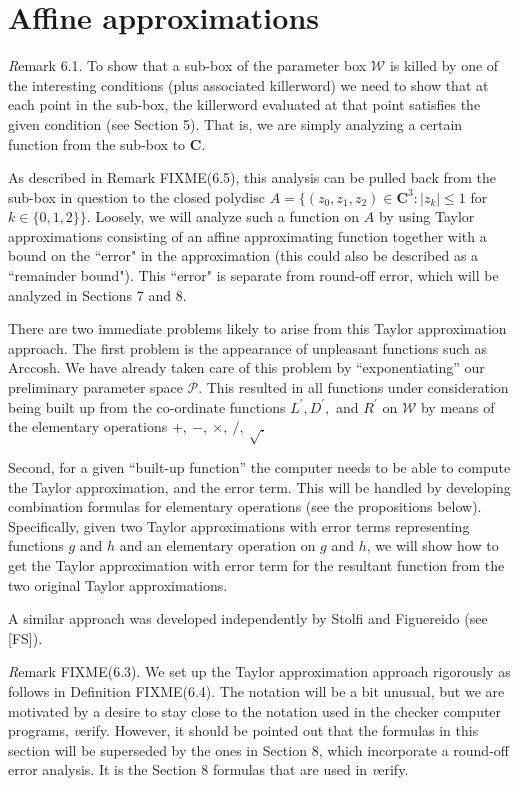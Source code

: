 \section{Affine approximations}

 
{\textit Remark} 6.1.
To show that a sub-box of the parameter box ${\mathcal W}$ is killed by one of the interesting conditions (plus associated killerword) we need to show that at each point in the sub-box, the killerword evaluated at that point satisfies the given condition (see
Section 5).  That is, we are simply analyzing a certain function from the sub-box to ${\mathbf C}$.  

As described in Remark FIXME(6.5), this analysis can be pulled back from the sub-box in question to the closed polydisc 
$A = \{(z_0,z_1,z_2) \in {\mathbf C}^3 : |z_k| \le 1$  for $k \in \{0,1,2\}\}.$  
Loosely,  we will analyze such a function on $A$ by using  Taylor approximations consisting of an affine approximating
function together with a bound on the ``error" in the approximation (this could also be described as a ``remainder bound").  This ``error" 
is separate from round-off error,  which will be analyzed in Sections 7 and 8.  

There are two immediate problems likely to arise from this Taylor approximation approach.
The first problem is the appearance of unpleasant functions such as 
Arccosh.  We have already taken care of this problem by ``exponentiating'' our preliminary parameter space ${\mathcal P}$.  This resulted in all functions under consideration being built up from the co-ordinate functions $ L^{\prime}, D^{\prime},$ and $ R^{\prime}$ on ${\mathcal W}$ by means of the elementary operations $+,\ -,\ \times,\ /,\ \sqrt.$ 

Second,  for a given ``built-up function'' the computer needs to be able to compute the Taylor approximation, and the error term.  This will be handled 
by developing combination formulas for elementary operations (see the propositions below).  Specifically, given two Taylor
approximations with error terms representing functions $g$ and $h$ and an elementary operation on $g$ and $h$, we will show how to
get the Taylor approximation with error term for the resultant function from the two original Taylor approximations. 

A similar approach was developed independently by Stolfi and Figuereido (see [FS]).

{\textit Remark} FIXME(6.3).
We set up the Taylor approximation approach rigorously
as follows in Definition FIXME(6.4).
The notation will be a bit unusual, but we are motivated by a desire to stay close to the notation used in the checker computer programs, {\textit verify}.  However, it should be pointed out that the formulas in this
section will be superseded by the ones in Section 8, which incorporate a round-off error analysis.  It is the Section 8 formulas that are
used in {\textit verify}.

